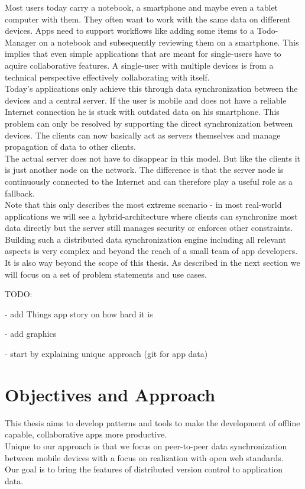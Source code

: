 Most users today carry a notebook, a smartphone and maybe even a tablet computer with them.
They often want to work with the same data on different devices.
Apps need to support workflows like adding some items to a Todo-Manager on a notebook and subsequently reviewing them on a smartphone.
This implies that even simple applications that are meant for single-users have to aquire collaborative features.
A single-user with multiple devices is from a technical perspective effectively collaborating with itself.\\
Today's applications only achieve this through  data synchronization between the devices and a central server.
If the user is mobile and does not have a reliable Internet connection he is stuck with outdated data on his smartphone.
This problem can only be resolved by supporting the direct synchronization between devices.
The clients can now basically act as servers themselves and manage propagation of data to other clients.\\
The actual server does not have to disappear in this model.
But like the clients it is just another node on the network.
The difference is that the server node is continuously connected to the Internet and can therefore play a useful role as a fallback.\\
Note that this only describes the most extreme scenario - in most real-world applications we will see a hybrid-architecture where clients can synchronize most data directly but the server still manages security or enforces other constraints.\\
Building such a distributed data synchronization engine including all relevant aspects is very complex and beyond the reach of a small team of app developers.
It is also way beyond the scope of this thesis.
As described in the next section we will focus on a set of problem statements and use cases.

TODO:

- add Things app story on how hard it is

- add graphics

- start by explaining unique approach (git for app data)

\section{Objectives and Approach}

This thesis aims to develop patterns and tools to make the development of offline capable, collaborative apps more productive.\\
Unique to our approach is that we focus on peer-to-peer data synchronization between mobile devices with a focus on realization with open web standards.\\
Our goal is to bring the features of distributed version control to application data.\\

